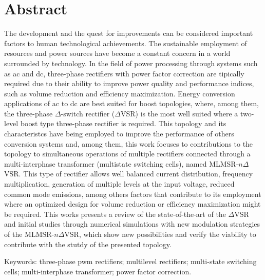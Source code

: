 \chapter*{Abstract}

\!\!\!\!\!\!\!\!\!\!\!\!\!\!\!\!\!\!\!

The development and the quest for improvements can be considered important factors to human technological achievements. The sustainable employment of resources and power sources have become a constant concern in a world surrounded by technology. In the field of power processing through systems such as ac and dc, three-phase rectifiers with power factor correction are tipically required due to their ability to improve power quality and performance indices, such as volume reduction and efficiency maximization. Energy conversion applications of ac to dc are best suited for boost topologies, where, among them, the three-phase $\Delta$-switch rectifier ($\Delta$VSR) is the most well suited where a two-level boost type three-phase rectifier is required. This topology and its characteristcs have being employed to improve the performance of others conversion systems and, among them, this work focuses to contributions to the topology to simultaneous operations of multiple rectifiers connected through a multi-interphase transformer (multistate switching cells), named MLMSR-$n\Delta$VSR. This type of rectifier allows well balanced current distribution, frequency multiplication, generation of multiple levels at the input voltage, reduced common mode emissions, among others factors that contribute to its employment where an optimized design for volume reduction or efficiency maximization might be required. This works presents a review of the state-of-the-art of the $\Delta$VSR and initial studies through numerical simulations with new modulation strategies of the MLMSR-$n\Delta$VSR, which show new possibilities and verify the viability to contribute with the stutdy of the presented topology.

\vspace{5mm}

\begin{flushleft}

\small{Keywords: three-phase pwm rectifiers; multilevel rectifiers; multi-state switching cells; multi-interphase transformer; power factor correction.}

\end{flushleft}
